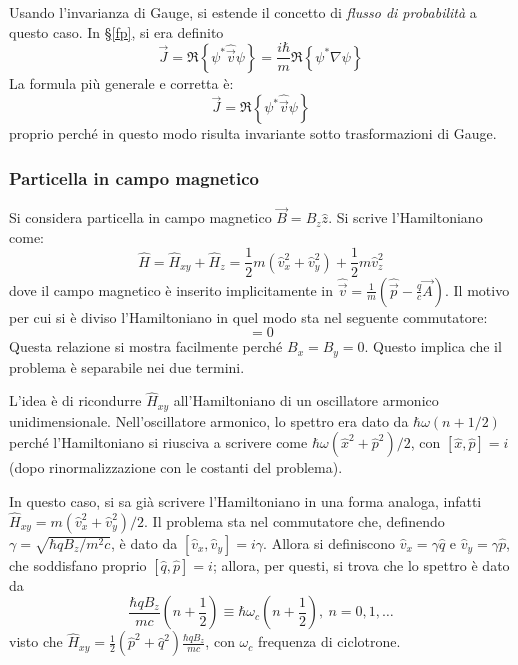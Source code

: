 \documentclass[11pt, a4paper]{scrartcl} %
\numberwithin{equation}{subsection}
\theoremstyle{style2}
\theoremstyle{style1}
\begin{document}
Usando l'invarianza di Gauge, si estende il concetto di \textit{flusso di probabilit\`a} a questo caso. 
In \S\ref{fp}, si era definito
\[
\vec{J}= \Re \left\{ \psi ^* \hat{\vec{v}} \psi \right\} = \frac{i\hbar }{m}\Re \left\{ \psi ^* \nabla \psi  \right\} 
\] 
La formula pi\`u generale e corretta \`e:
\begin{equation}
	\vec{J}= \Re \left\{ \psi ^* \hat{\vec{v}} \psi \right\} 
\end{equation}
proprio perch\'e in questo modo risulta invariante sotto trasformazioni di Gauge.
\subsubsection{Particella in campo magnetico}
Si considera particella in campo magnetico $\vec{B}=B_z \hat{z}$. 
Si scrive l'Hamiltoniano come:
\begin{equation}
	\hat{H} = \hat{H}_{xy} + \hat{H}_z = \frac{1}{2}m \left(\hat{v}_x^2 + \hat{v}_y^2\right) + \frac{1}{2}m \hat{v}_z^2
\end{equation}
dove il campo magnetico \`e inserito implicitamente in $\hat{\vec{v}}= \frac{1}{m}\left(\hat{\vec{p}}-\frac{q}{c}\vec{A}\right) $.
Il motivo per cui si \`e diviso l'Hamiltoniano in quel modo sta nel seguente commutatore:
\begin{equation}
	[\hat{H}_{xy} , \hat{H}_z] =  0
\end{equation}
Questa relazione si mostra facilmente perch\'e $B_x = B_y = 0$.
Questo implica che il problema \`e separabile nei due termini. 

\vspace{.5cm}
L'idea \`e di ricondurre $\hat{H}_{xy} $ all'Hamiltoniano di un oscillatore armonico unidimensionale.
Nell'oscillatore armonico, lo spettro era dato da $\hbar \omega (n + 1 /2)$ perch\'e l'Hamiltoniano si riusciva a scrivere come $\hbar \omega (\hat{x}^2 + \hat{p}^2) / 2$, con $[\hat{x},\hat{p}] = i$ (dopo rinormalizzazione con le costanti del problema).

In questo caso, si sa gi\`a scrivere l'Hamiltoniano in una forma analoga, infatti $\hat{H}_{xy}  = m(\hat{v}_x^2 + \hat{v}_y^2) / 2$. 
Il problema sta nel commutatore che, definendo $\gamma = \sqrt{\hbar q B_z / m^2 c} $, \`e dato da $[\hat{v}_x,\hat{v}_y] = i \gamma$.
Allora si definiscono $\hat{v}_x=\gamma \hat{q}$ e $\hat{v}_y = \gamma\hat{p}$, che soddisfano proprio $[\hat{q}, \hat{p}] = i$; allora, per questi, si trova che lo spettro \`e dato da
\begin{equation}
	\frac{\hbar q B_z}{mc}\left(n + \frac{1}{2}\right) \equiv \hbar \omega_c \left(n+\frac{1}{2}\right) , \ n = 0,1,\ldots
\end{equation}
visto che $\hat{H}_{xy} = \frac{1}{2}\left(\hat{p}^2 + \hat{q}^2\right) \frac{\hbar q B_z}{mc}$, con $\omega_c$ frequenza di ciclotrone.
\end{document}
